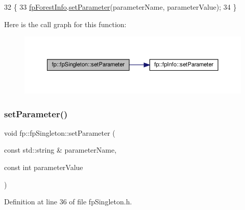 \begin{DoxyCode}
32                                                                                                  \{
33                 \hyperlink{classfp_1_1fpSingleton_a85965009befa72a749ae498fa5b6ccfa}{fpForestInfo}.\hyperlink{classfp_1_1fpInfo_ae4c749c466e983cb312cc08d38b2796e}{setParameter}(parameterName, parameterValue);
34             \}
\end{DoxyCode}
Here is the call graph for this function\+:\nopagebreak
\begin{figure}[H]
\begin{center}
\leavevmode
\includegraphics[width=350pt]{classfp_1_1fpSingleton_a19dd80e98acb4dd3e82be5e744840d1f_cgraph}
\end{center}
\end{figure}
\mbox{\label{classfp_1_1fpSingleton_a3465c3ff9376fae2933d9267c32761ca}} 
\subsubsection{\texorpdfstring{set\+Parameter()}{setParameter()}\hspace{0.1cm}{\footnotesize\ttfamily [3/3]}}
{\footnotesize\ttfamily void fp\+::fp\+Singleton\+::set\+Parameter (\begin{DoxyParamCaption}\item[{const std\+::string \&}]{parameter\+Name,  }\item[{const int}]{parameter\+Value }\end{DoxyParamCaption})\hspace{0.3cm}{\ttfamily [inline]}}



Definition at line 36 of file fp\+Singleton.\+h.


